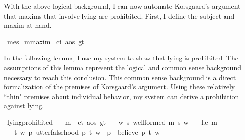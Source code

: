 \begin{isabellebody}
%
\begin{isamarkuptext}%
With the above logical background, I can now automate Korsgaard's argument that maxims that involve
lying are prohibited. First, I define the subject and maxim at hand.%
\end{isamarkuptext}\isamarkuptrue%
\isamarkupfalse%
\ me{\isacharcolon}{\isacharcolon}s\isanewline
%
\isanewline
{}\isamarkupfalse%
\ m{\isacharcolon}{\isacharcolon}maxim\isanewline
%
\isanewline
{}\isamarkupfalse%
\ c{\isacharcolon}{\isacharcolon}t\ a{\isacharcolon}{\isacharcolon}os\ g{\isacharcolon}{\isacharcolon}t\isanewline
%
%
\begin{isamarkuptext}%
In the following lemma, I use my system to show that lying is prohibited. The assumptions of 
this lemma represent the logical and common sense background necessary to reach this conclusion. This
common sense background is a direct formalization of the premises of Korsgaard's argument. Using these
relatively ``thin" premises about individual behavior, my system can derive a prohibition against lying.%
\end{isamarkuptext}\isamarkuptrue%
\isamarkupfalse%
\ lying{\isacharunderscore}prohibited{\isacharcolon}\isanewline
\ \ \ {\isachardoublequoteopen}m\ {\isasymequiv}\ {\isacharparenleft}c{\isacharcolon}{\isacharcolon}t{\isacharcomma}\ a{\isacharcolon}{\isacharcolon}os{\isacharcomma}\ g{\isacharcolon}{\isacharcolon}t{\isacharparenright}{\isachardoublequoteclose}\isanewline
\ \ \ {\isachardoublequoteopen}{\isasymforall}w{\isachardot}\ {\isasymforall}s{\isachardot}\ well{\isacharunderscore}formed\ m\ s\ w{\isachardoublequoteclose}\isanewline
%
\isanewline
\ \ \ {\isachardoublequoteopen}lie\ m{\isachardoublequoteclose}\isanewline
%
\isanewline
\ \ \ {\isachardoublequoteopen}{\isasymforall}t\ w{\isachardot}\ {\isacharparenleft}{\isacharparenleft}{\isasymforall}p{\isachardot}\ utter{\isacharunderscore}falsehood\ p\ t\ w{\isacharparenright}\ {\isasymlongrightarrow}\ {\isacharparenleft}{\isasymforall}p{\isachardot}\ \isactrlbold {\isasymnot}\ {\isacharparenleft}believe\ p\ t{\isacharparenright}\ w{\isacharparenright}{\isacharparenright}{\isachardoublequoteclose}\isanewline

\end{isabellebody}
